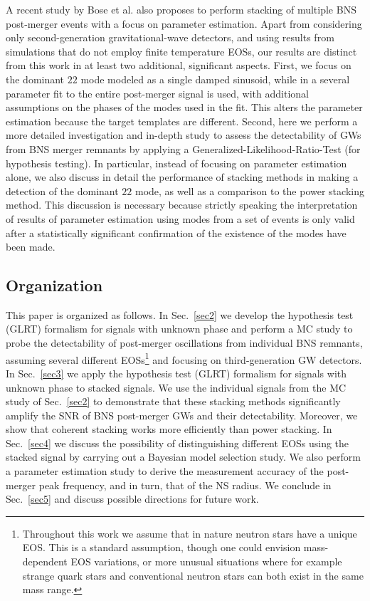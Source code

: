 \documentclass[prd,aps,floatfix,superscriptaddress,nofootinbib,twocolumn,10pt,English]{revtex4-1}
\begin{document}
A recent study by Bose et al. \cite{bose2017neutron} also proposes to
perform stacking of multiple BNS post-merger events with a focus on
parameter estimation. Apart from considering only second-generation
gravitational-wave detectors, and using results from simulations that
do not employ finite temperature EOSs, our results are distinct from
this work in at least two additional, significant aspects. First, we
focus on the dominant $22$ mode modeled as a single damped sinusoid,
while in \cite{bose2017neutron} a several parameter fit to the entire
post-merger signal is used, with additional assumptions on the phases
of the modes used in the fit. This alters the parameter estimation
because the target templates are different. Second, here we perform a
more detailed investigation and in-depth study to assess the
detectability of GWs from BNS merger remnants by applying a
Generalized-Likelihood-Ratio-Test (for hypothesis testing). In
particular, instead of focusing on parameter estimation alone, we also
discuss in detail the performance of stacking methods in making a
detection of the dominant $22$ mode, as well as a comparison to the
power stacking method. This discussion is necessary because strictly
speaking the interpretation of results of parameter estimation using
modes from a set of events is only valid after a statistically significant
confirmation of the existence of the modes have been made.

\subsection{Organization}

This paper is organized as follows. In Sec.~\ref{sec2} we develop the
hypothesis test (GLRT) formalism for signals with unknown phase and
perform a MC study to probe the detectability of post-merger
oscillations from individual BNS remnants, assuming several different
EOSs\footnote{Throughout this work we assume that in nature neutron
  stars have a unique EOS. This is a standard assumption, though one
  could envision mass-dependent EOS variations, or more unusual
  situations where for example strange quark stars and conventional
  neutron stars can both exist in the same mass range.} and focusing
on third-generation GW detectors.  In Sec.~\ref{sec3} we apply the
hypothesis test (GLRT) formalism for signals with unknown phase to
stacked signals. We use the individual signals from the MC study of
Sec.~\ref{sec2} to demonstrate that these stacking methods
significantly amplify the SNR of BNS post-merger GWs and their
detectability. Moreover, we show that coherent stacking works more
efficiently than power stacking.  In Sec.~\ref{sec4} we discuss the
possibility of distinguishing different EOSs using the stacked signal
by carrying out a Bayesian model selection study. We also perform a
parameter estimation study to derive the measurement accuracy of the
post-merger peak frequency, and in turn, that of the NS radius.  We
conclude in Sec.~\ref{sec5} and discuss possible directions for future
work.
\end{document}
